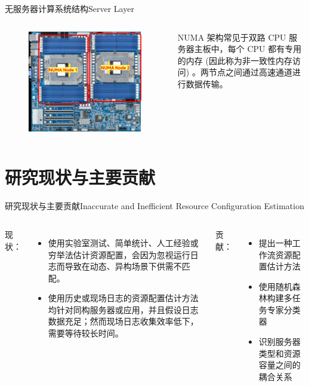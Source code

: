 \documentclass[aspectratio=169]{beamer}
\begin{document}
\begin{frame}{无服务器计算系统结构}{Server Layer}
\begin{columns}
    \begin{figure}
      \centering
      \includegraphics[height=0.5\textheight]{img/serverless-system-architecture/NUMA-nodes.png}
    \end{figure}
    NUMA 架构常见于双路 CPU 服务器主板中，每个 CPU 都有专用的内存 (因此称为非一致性内存访问) 。两节点之间通过高速通道进行数据传输。
  \end{columns}
\end{frame}

\section{研究现状与主要贡献}

\begin{frame}{研究现状与主要贡献}{Inaccurate and Inefficient Resource Configuration Estimation}
  \begin{columns}
    现状：
    \begin{itemize}
      \item 使用实验室测试、简单统计、人工经验或穷举法估计资源配置，会因为忽视运行日志而导致在动态、异构场景下供需不匹配。
      \item 使用历史或现场日志的资源配置估计方法均针对同构服务器或应用，并且假设日志数据充足；然而现场日志收集效率低下，需要等待较长时间。
    \end{itemize}

    贡献：
    \begin{itemize}
      \item 提出一种工作流资源配置估计方法
      \item 使用随机森林构建多任务专家分类器
      \item 识别服务器类型和资源容量之间的耦合关系
    \end{itemize}
  \end{columns}
\end{frame}
\end{document}
